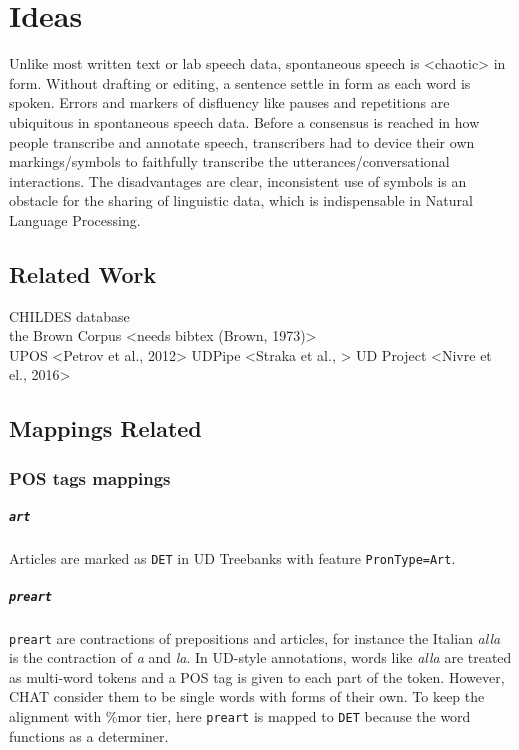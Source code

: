 \chapter{Ideas} %

\label{Chapter7} %

Unlike most written text or lab speech data, spontaneous speech is <chaotic> in form. Without drafting or editing, a sentence settle in form as each word is spoken. Errors and markers of disfluency like pauses and repetitions are ubiquitous in spontaneous speech data. Before a consensus is reached in how people transcribe and annotate speech, transcribers had to device their own markings/symbols to faithfully transcribe the utterances/conversational interactions. The disadvantages are clear, inconsistent use of symbols is an obstacle for the sharing of linguistic data, which is indispensable in Natural Language Processing.\\


\section{Related Work}

CHILDES database \cite{Macwhinney2000}\\
the Brown Corpus <needs bibtex (Brown, 1973)>\\
UPOS <Petrov et al., 2012>
UDPipe <Straka et al., >
UD Project <Nivre et el., 2016>

\section{Mappings Related} %
\label{sec:mappings}

\subsection{POS tags mappings}

\paragraph{\texttt{art}}
Articles are marked as \texttt{DET} in UD Treebanks with feature \texttt{PronType=Art}.\\
\paragraph{\texttt{preart}}
\texttt{preart} are contractions of prepositions and articles, for instance the Italian \emph{alla} is the contraction of \emph{a} and \emph{la}. In UD-style annotations, words like \emph{alla} are treated as multi-word tokens and a POS tag is given to each part of the token. However, CHAT consider them to be single words with forms of their own. To keep the alignment with \%mor tier, here \texttt{preart} is mapped to \texttt{DET} because the word functions as a determiner.\\ 

